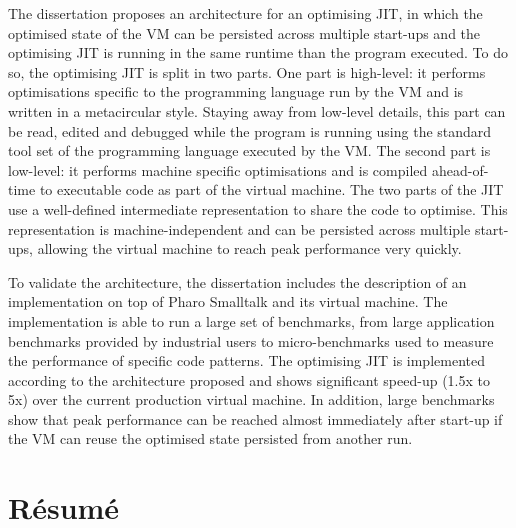 \documentclass[a4paper,12pt,twoside]{includes/ThesisStyle}
\begin{document}
The dissertation proposes an architecture for an optimising JIT, in which the optimised state of the VM can be persisted across multiple start-ups and the optimising JIT is running in the same runtime than the program executed. To do so, the optimising JIT is split in two parts. One part is high-level: it performs optimisations specific to the programming language run by the VM and is written in a metacircular style. Staying away from low-level details, this part can be read, edited and debugged while the program is running using the standard tool set of the programming language executed by the VM. The second part is low-level: it performs machine specific optimisations and is compiled ahead-of-time to executable code as part of the virtual machine. The two parts of the JIT use a well-defined intermediate representation to share the code to optimise. This representation is machine-independent and can be persisted across multiple start-ups, allowing the virtual machine to reach peak performance very quickly.

To validate the architecture, the dissertation includes the description of an implementation on top of Pharo Smalltalk and its virtual machine. The implementation is able to run a large set of benchmarks, from large application benchmarks provided by industrial users to micro-benchmarks used to measure the performance of specific code patterns. The optimising JIT is implemented according to the architecture proposed and shows significant speed-up (1.5x to 5x) over the current production virtual machine. In addition, large benchmarks show that peak performance can be reached almost immediately after start-up if the VM can reuse the optimised state persisted from another run.

\cleardoublepage

\section*{R\'esum\'e}

\tableofcontents
\listoffigures

\mainmatter








%




\appendix




\end{document}
